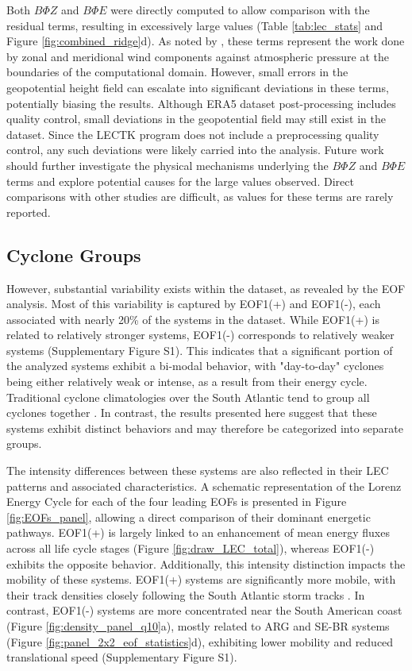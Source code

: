 \documentclass[pdflatex,sn-chicago]{sn-jnl}%
\theoremstyle{plain}
\theoremstyle{definition}
\theoremstyle{remark}
\theoremstyle{definition}
\begin{document}
Both $B\Phi Z$ and $B\Phi E$ were directly computed to allow comparison with the residual terms, resulting in excessively large values (Table \ref{tab:lec_stats} and Figure \ref{fig:combined_ridge}d). As noted by \citet{brennan1980zonal}, these terms represent the work done by zonal and meridional wind components against atmospheric pressure at the boundaries of the computational domain. However, small errors in the geopotential height field can escalate into significant deviations in these terms, potentially biasing the results. Although ERA5 dataset post-processing includes quality control, small deviations in the geopotential field may still exist in the dataset. Since the LECTK program does not include a preprocessing quality control, any such deviations were likely carried into the analysis. Future work should further investigate the physical mechanisms underlying the $B\Phi Z$ and $B\Phi E$ terms and explore potential causes for the large values observed. Direct comparisons with other studies are difficult, as values for these terms are rarely reported.

\subsection{Cyclone Groups}

However, substantial variability exists within the dataset, as revealed by the EOF analysis. Most of this variability is captured by EOF1(+) and EOF1(-), each associated with nearly 20\% of the systems in the dataset. While EOF1(+) is related to relatively stronger systems, EOF1(-) corresponds to relatively weaker systems (Supplementary Figure S1). This indicates that a significant portion of the analyzed systems exhibit a bi-modal behavior, with "day-to-day" cyclones being either relatively weak or intense, as a result from their energy cycle. Traditional cyclone climatologies over the South Atlantic tend to group all cyclones together \citep[e.g.,]{sinclair1994objective,hoskins2005new,reboita2010south,gramcianinov2019properties}. In contrast, the results presented here suggest that these systems exhibit distinct behaviors and may therefore be categorized into separate groups.

The intensity differences between these systems are also reflected in their LEC patterns and associated characteristics. A schematic representation of the Lorenz Energy Cycle for each of the four leading EOFs is presented in Figure \ref{fig:EOFs_panel}, allowing a direct comparison of their dominant energetic pathways. EOF1(+) is largely linked to an enhancement of mean energy fluxes across all life cycle stages (Figure \ref{fig:draw_LEC_total}), whereas EOF1(-) exhibits the opposite behavior. Additionally, this intensity distinction impacts the mobility of these systems. EOF1(+) systems are significantly more mobile, with their track densities closely following the South Atlantic storm tracks \citep{hoskins2005new,gramcianinov2019properties}. In contrast, EOF1(-) systems are more concentrated near the South American coast (Figure \ref{fig:density_panel_q10}a), mostly related to ARG and SE-BR systems (Figure \ref{fig:panel_2x2_eof_statistics}d), exhibiting lower mobility and reduced translational speed (Supplementary Figure S1).
\end{document}
